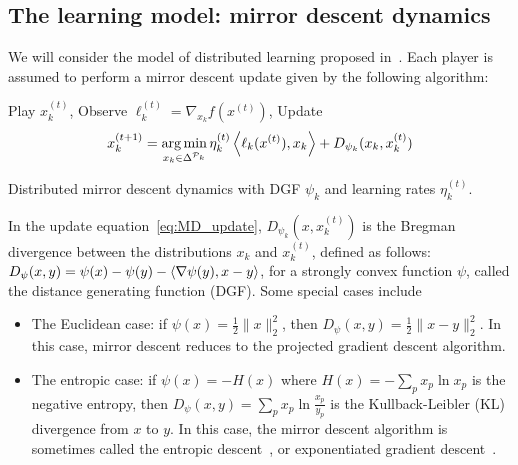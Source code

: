\documentclass{sig-alternate-ipsn13}
\begin{document}
\subsection{The learning model: mirror descent dynamics}
\label{sec:learning}
We will consider the model of distributed learning proposed in~\cite{krichene2015MD}. Each player is assumed to perform a mirror descent update given by the following algorithm:
\begin{algorithm}[H]
\begin{algorithmic}
\STATE Play $x^{(t)}_k$,
\STATE Observe $\ell_k^{(t)} = \nabla_{x_k} f(x^{(t)})$,
\STATE Update
\begin{equation}
x^{(t+1)}_k = \operatorname*{arg\,min}_{x_k \in \Delta^{\mathcal{P}_k}} \eta_k^{(t)} \left\langle \ell_k(x^{(t)}), x_k \right\rangle + D_{\psi_k}(x_k, x^{(t)}_k)
\label{eq:MD_update}
\end{equation}
\ENDFOR
\end{algorithmic}
\caption{Distributed mirror descent dynamics with DGF $\psi_k$ and learning rates $\eta_k^{(t)}$.}
\label{alg:MD}
\end{algorithm}
In the update equation~\eqref{eq:MD_update}, $D_{\psi_k}(x, x^{(t)}_k)$ is the Bregman divergence between the distributions $x_k$ and $x_k^{(t)}$, defined as follows: $D_\psi(x, y) = \psi(x) - \psi(y) - \left\langle \nabla \psi(y), x - y \right\rangle$, for a strongly convex function $\psi$, called the distance generating function (DGF). Some special cases include
\begin{itemize}
\item The Euclidean case: if $\psi(x) = \frac{1}{2}\|x\|^2_2$, then $D_\psi(x, y) = \frac{1}{2}\|x - y\|_2^2$. In this case, mirror descent reduces to the projected gradient descent algorithm.
\item The entropic case: if $\psi(x) = - H(x)$ where $H(x) = -\sum_{p} x_p \ln x_p$ is the negative entropy, then $D_\psi(x, y) = \sum_p x_p \ln \frac{x_p}{y_p}$ is the Kullback-Leibler (KL) divergence from $x$ to $y$. In this case, the mirror descent algorithm is sometimes called the entropic descent~\cite{beck2003mirror}, or exponentiated gradient descent~\cite{kivinen1997exponentiated}.
\end{itemize}
\end{document}
